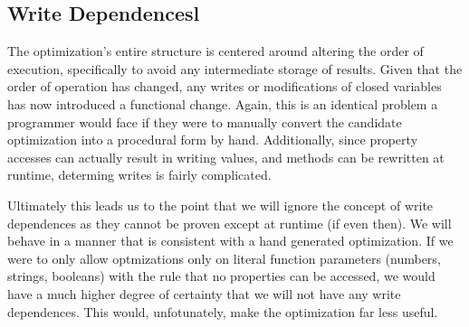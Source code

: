 \subsection{Write Dependencesl}

The optimization's entire structure is centered around altering the order of execution, specifically to avoid any intermediate storage of results.  Given that the order of operation has changed, any writes or modifications of closed variables has now introduced a functional change.  Again, this is an identical problem a programmer would face if they were to manually convert the candidate optimization into a procedural form by hand.  Additionally, since property accesses can actually result in writing values, and methods can be rewritten at runtime, determing writes is fairly complicated. 

Ultimately this leads us to the point that we will ignore the concept of write dependences as they cannot be proven except at runtime (if even then).  We will behave in a manner that is consistent with a hand generated optimization.  If we were to only allow optmizations only on literal function parameters (numbers, strings, booleans) with the rule that no properties can be accessed, we would have a much higher degree of certainty that we will not have any write dependences. This would, unfotunately, make the optimization far less useful.  